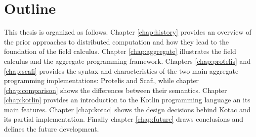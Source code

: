 \section{Outline}
This thesis is organized as follows. Chapter \ref{chap:history} provides an overview of the prior approaches to distributed computation and how they lead to the foundation of the field calculus. Chapter \ref{chap:aggregate} illustrates the field calculus and the aggregate programming framework. Chapters \ref{chap:protelis} and \ref{chap:scafi} provides the syntax and characteristics of the two main aggregate programming implementations: Protelis and Scafi, while chapter \ref{chap:comparison} shows the differences between their semantics. Chapter \ref{chap:kotlin} provides an introduction to the Kotlin programming language an its main features. Chapter \ref{chap:kotac} shows the design decisions behind Kotac and its partial implementation. Finally chapter \ref{chap:future} draws conclusions and delines the future development.
